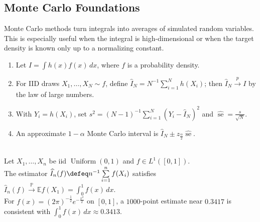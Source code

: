 \subsection{Monte Carlo Foundations}

Monte Carlo methods turn integrals into averages of simulated random variables. This is especially useful when the integral is high-dimensional or when the target density is known only up to a normalizing constant.

\begin{method} \label{method:basic-monte-carlo-integration} 
\begin{enumerate}[label=(\roman*)]
\setlength{\itemsep}{0pt}
\item Let $I=\int h(x)f(x)\,dx$, where $f$ is a probability density.
\item For IID draws $X_1,\ldots,X_N\sim f$, define $\widehat{I}_N=N^{-1}\sum\limits_{i=1}^{N}h(X_i)$; then $\widehat{I}_N\xrightarrow{p}I$ by the law of large numbers.
\item With $Y_i=h(X_i)$, set $s^2=(N-1)^{-1}\sum\limits_{i=1}^{N}(Y_i-\widehat{I}_N)^2$ and $\widehat{\operatorname{se}}=\frac{s}{\sqrt{N}}$.
\item An approximate $1-\alpha$ Monte Carlo interval is $\widehat{I}_N\pm z_{\frac{\alpha}{2}}\widehat{\operatorname{se}}$.
\end{enumerate}
\end{method}

\begin{example} \label{ex:monte-carlo-integration-lln} \\
Let $X_1,\ldots,X_n$ be iid $\operatorname{Uniform}(0,1)$ and $f\in L^1([0,1])$.\\
The estimator $\widehat I_n(f)\defeq n^{-1}\sum\limits_{i=1}^{n}f(X_i)$ satisfies $\widehat I_n(f)\xrightarrow{\mathbb{P}}\mathbb{E}f(X_1)=\int_0^1f(x)\,dx$.\\
For $f(x)=(2\pi)^{-\frac{1}{2}}e^{-\frac{x^2}{2}}$ on $[0,1]$, a $1000$-point estimate near $0.3417$ is consistent with $\int_0^1f(x)\,dx\approx0.3413$.
\end{example}

